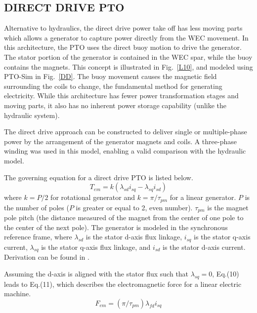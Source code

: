 \documentclass[twocolumn,10pt]{asme2e}
\begin{document}
    
\subsection*{DIRECT DRIVE PTO}
Alternative to hydraulics, the direct drive power take off has less moving parts which allows a generator to capture power directly from the WEC movement. In this architecture, the PTO uses the direct buoy motion to drive the generator. The stator portion of the generator is contained in the WEC spar, while the buoy contains the magnets. This concept is illustrated in Fig.~\ref{L10}, and modeled using PTO-Sim in  Fig.~\ref{DD}. The buoy movement causes the magnetic field surrounding the coils to change, the fundamental method for generating electricity. While this architecture has fewer power transformation stages and moving parts, it also has no inherent power storage capability (unlike the hydraulic system).

The direct drive approach can be constructed to deliver single or multiple-phase power by the arrangement of the generator magnets and coils. A three-phase winding was used in this model, enabling a valid comparison with the hydraulic model.  

The governing equation for a direct drive PTO is listed below. 
\begin{equation}
T_{em}=k(\lambda_{sd}i_{sq}- \lambda_{sq}i_{sd})
\end{equation}
\noindent where $k = P/2$ for rotational generator and $k = \pi/\tau_{pm}$ for a linear generator. $P$ is the number of poles ($P$ is greater or equal to 2, even number). $\tau_{pm}$ is the magnet pole pitch (the distance measured of the magnet from the center of one pole to the center of the next pole). The generator is modeled in the synchronous reference frame, where $\lambda_{sd}$ is the stator d-axis flux linkage, $i_{sq}$ is the stator q-axis current, $\lambda_{sq}$ is the stator q-axis flux linkage, and $i_{sd}$ is the stator d-axis current.  Derivation can be found in \cite{mohan2001advanced}.

Assuming the d-axis is aligned with the stator flux such that $\lambda_{sq} = 0$, Eq.(10) leads to Eq.(11), which describes the electromagnetic force for a linear electric machine. 
\begin{equation}
F_{em}=(\pi/\tau_{pm})\lambda_{fd}i_{sq}
\end{equation}
\end{document}
